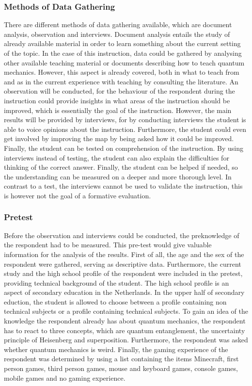 \documentclass[11pt,twoside]{report} %
\begin{document}
\subsubsection{Methods of Data Gathering}

There are different methods of data gathering available, which are document analysis, observation and interviews. Document analysis entails the study of already available material in order to learn something about the current setting of the topic. In the case of this instruction, data could be gathered by analysing other available teaching material or documents describing how to teach quantum mechanics. However, this aspect is already covered, both in what to teach from  and as in the current experience with teaching by consulting the literature. An observation will be conducted, for the behaviour of the respondent during the instruction could provide insights in what areas of the instruction should be improved, which is essentially the goal of the instruction. However, the main results will be provided by interviews, for by conducting interviews the student is able to voice opinions about the instruction. Furthermore, the student could even get involved by improving the map by being asked how it could be improved. Finally, the student can be tested on comprehension of the instruction. By using interviews instead of testing, the student can also explain the difficulties for thinking of the correct answer. Finally, the student can be helped if needed, so the understanding can be measured on a deeper and more thorough level. In contrast to a test, the interviews cannot be used to validate the instruction, this is however not the goal of a formative evaluation.

\subsubsection{Pretest}

Before the observation and interviews could be conducted, the preknowledge of the respondent had to be measured. This pre-test would give valuable information for the analysis of the results. First of all, the age and the sex of the respondent were gathered, serving as descriptive data. Furthermore, the current study and the high school profile of the respondent were included in the pretest, providing technical background of the student. The high school profile is an aspect of secondary education in the Netherlands. In the upper half of secondary eduction, the student is allowed to choose between a profile containing non technical subjects or a profile containing technical subjects. To gain an idea of the knowledge the respondent already has about quantum mechanics, the respondent has to react to three concepts, which are quantum entanglement, the uncertainty principle of Heisenberg and superposition. Furthermore, the respondent was asked whether quantum mechanics is weird. Finally, the gaming experience of the respondent was determined by using a list containing the items Minecraft, first person games, third person games, mouse and keyboard games, console games, mobile games and no gaming experience.
\end{document}

